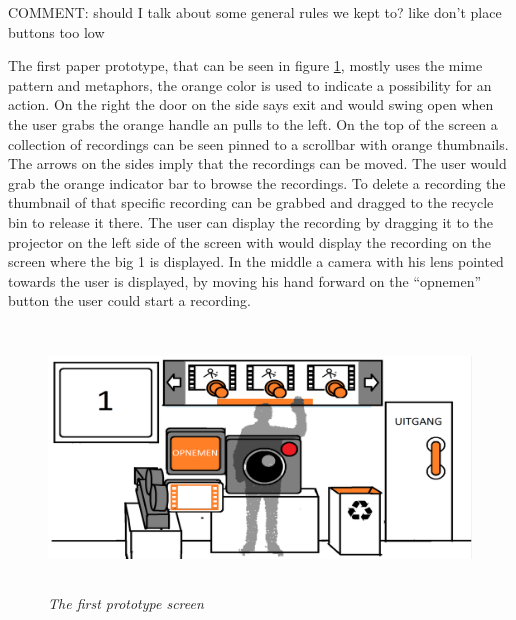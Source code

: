 {\large COMMENT: should I talk about some general rules we kept to? like don't place buttons too low}

The first paper prototype, that can be seen in figure \ref{first prototype}, mostly uses the mime pattern and metaphors, the orange color is used to indicate a possibility for an action. On the right the door on the side says exit and would swing open when the user grabs the orange handle an pulls to the left. On the top of the screen a collection of recordings can be seen pinned to a scrollbar with orange thumbnails. The arrows on the sides imply that the recordings can be moved. The user would grab the orange indicator bar to browse the recordings. To delete a recording the thumbnail of that specific recording can be grabbed and dragged to the recycle bin to release it there. The user can display the recording by dragging it to the projector on the left side of the screen with would display the recording on the screen where the big 1 is displayed. In the middle a camera with his lens pointed towards the user is displayed, by moving his hand forward on the ``opnemen'' button the user could start a recording.

\begin{figure}[H]
	\begin{center}
		\includegraphics[width=12.5cm, height=7cm]{figures/prototype_1_1_standard.png}
		\caption{\emph{The first prototype screen}}
		\label{first prototype}
	\end{center}
\end{figure}

